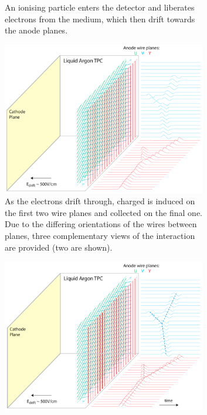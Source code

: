 \begin{figure}[p]
\begin{subfigure}[t]{0.48\linewidth}
    \caption{An ionising particle enters the detector and liberates electrons from the medium, which then drift towards the anode planes.}
    \label{fig:LArTPCOperation2}
  \end{subfigure}
  \hfill
    \begin{subfigure}[t]{0.48\linewidth}
    \centering
    \includegraphics[width=0.98\textwidth]{LArTPCOperation3.png}
    \caption{As the electrons drift through, charged is induced on the first two wire planes and collected on the final one.  Due to the differing orientations of the wires between planes, three complementary views of the interaction are provided (two are shown).}
    \label{fig:LArTPCOperation3}
  \end{subfigure}
  \hfill
  \begin{subfigure}[t]{0.48\linewidth}
    \centering
    \includegraphics[width=0.98\textwidth]{LArTPCOperation4.png}

\end{subfigure}
\end{figure}
